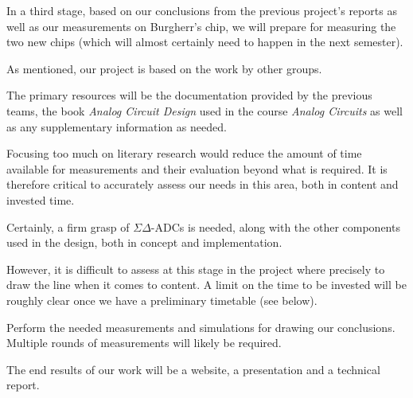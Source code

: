 \documentclass[a4paper,10pt]{article}
\begin{document}
\begin{description}[align=left]
        In a third stage, based on our conclusions from the previous project's
        reports  as well  as  our  measurements on  Burgherr's  chip, we  will
        prepare for measuring  the two new chips (which  will almost certainly
        need to happen in the next semester).
    \item[Preceding Work:]
        As mentioned, our project is based on the work by other groups.
    \item[Sources:]
        The  primary  resources will  be  the  documentation provided  by  the
        previous  teams, the  book \emph{Analog  Circuit Design}  used in  the
        course \emph{Analog Circuits} as well as any supplementary information
        as needed.
    \item[Scope of Literary Research:]
        Focusing too much on literary research would reduce the amount of time
        available  for  measurements  and  their  evaluation  beyond  what  is
        required. It is therefore  critical to accurately assess  our needs in
        this area, both in content and invested time.

        Certainly, a firm  grasp of $\Sigma\Delta$-ADCs is  needed, along with
        the  other  components  used  in  the  design,  both  in  concept  and
        implementation.

        However, it is difficult to assess  at this stage in the project where
        precisely to  draw the line when  it comes to content. A  limit on the
        time to be  invested will be roughly clear once  we have a preliminary
        timetable (see below).
    \item[Scope of Experiments:]
        Perform  the  needed  measurements  and simulations  for  drawing  our
        conclusions. Multiple rounds of measurements will likely be required.
    \item[Genre and Addressees:]
        The end results  of our work will  be a website, a  presentation and a
        technical report.


\end{description}
\end{document}
